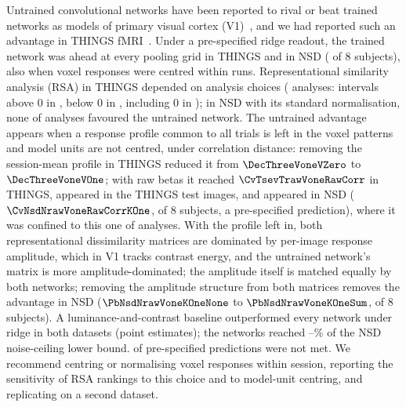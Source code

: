 Untrained convolutional networks have been reported to rival or beat trained networks as models of
primary visual cortex (V1)~\citep{truzzi2020, kazemian2025}, and we had reported such an advantage
in THINGS fMRI~\citep{evalres}. Under a pre-specified ridge readout, the trained network was ahead at
every pooling grid in THINGS and in NSD (\NsdRidgeVoneGFourNeg{} of 8 subjects), also when voxel
responses were centred within runs. Representational similarity analysis (RSA) in THINGS depended on
analysis choices (\MultiDistinct{} analyses: intervals above 0 in \MultiDistinctPos, below 0 in
\MultiDistinctNeg, including 0 in \MultiDistinctIncl); in NSD with its standard normalisation, none
of \MvNsessionDistinct{} analyses favoured the untrained network. The untrained advantage appears
when a response profile common to all trials is left in the voxel patterns and model units are not
centred, under correlation distance: removing the session-mean profile in THINGS reduced it from
$\DecThreeVoneVZero$ to $\DecThreeVoneVOne$; with raw betas it reached $\CvTsevTrawVoneRawCorr$ in
THINGS, appeared in the THINGS test images, and appeared in NSD ($\CvNsdNrawVoneRawCorrKOne$,
\CvNsdNrawVoneRawCorrKOnePos{} of 8 subjects, a pre-specified prediction), where it was confined to
this one of \MvNrawDistinct{} analyses. With the profile left in, both representational
dissimilarity matrices are dominated by per-image response amplitude, which in V1 tracks contrast
energy, and the untrained network's matrix is more amplitude-dominated; the amplitude itself is
matched equally by both networks; removing the amplitude structure from both matrices removes the
advantage in NSD ($\PbNsdNrawVoneKOneNone$ to $\PbNsdNrawVoneKOneSum$, \PbNsdNrawVoneKOneSumLe{} of 8
subjects). A luminance-and-contrast baseline outperformed every network under ridge in both datasets
(point estimates); the networks reached \CeilVoneFracMin--\CeilVoneFracMax\% of the NSD noise-ceiling
lower bound. \FailedPredictions{} of \TotalPredictions{} pre-specified predictions were not met. We
recommend centring or normalising voxel responses within session, reporting the sensitivity of RSA
rankings to this choice and to model-unit centring, and replicating on a second dataset.
